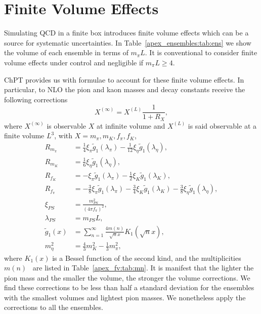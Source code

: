 
\chapter{Finite Volume Effects}
\label{apex_fv}

Simulating QCD in a finite box introduces finite volume effects which can be a source for systematic uncertainties. In Table~\ref{apex_ensembles:tab:ens} we show the volume of each ensemble in terms of $m_{\pi}L$. It is conventional to consider finite volume effects under control and negligible if $m_{\pi}L\geq4$.

ChPT provides us with formulae to account for these finite volume effects. In particular, to NLO the pion and kaon masses and decay constants receive the following corrections~\citep{Colangelo:2003hf,Colangelo:2005gd}
\begin{equation}
X^{(\infty)}=X^{(L)}\frac{1}{1+R_X},
\end{equation}
where $X^{(\infty)}$ is observable $X$ at infinite volume and $X^{(L)}$ is said observable at a finite volume $L^3$, with $X=m_{\pi},m_K,f_{\pi},f_K$,
\begin{align}
R_{m_{\pi}}&=\frac{1}{4}\xi_{\pi}\tilde{g}_1(\lambda_{\pi})-\frac{1}{12}\xi_{\eta}\tilde{g}_1(\lambda_{\eta}), \\
R_{m_K}&=\frac{1}{6}\xi_{\eta}\tilde{g}_1(\lambda_{\eta}), \\
R_{f_K}&=-\xi_{\pi}\tilde{g}_1(\lambda_{\pi})-\frac{1}{2}\xi_{K}\tilde{g}_1(\lambda_{K}), \\
R_{f_{\pi}}&=-\frac{3}{8}\xi_{\pi}\tilde{g}_1(\lambda_{\pi})-\frac{3}{4}\xi_{K}\tilde{g}_1(\lambda_{K})-\frac{3}{8}\xi_{\eta}\tilde{g}_1(\lambda_{\eta}), \\
\xi_{PS}&=\frac{m_{PS}^2}{(4\pi f_{\pi})^2}, \\
\lambda_{PS}&=m_{PS}L, \\
\tilde{g}_1(x)&=\sum_{n=1}^{\infty}\frac{4m(n)}{\sqrt{n}x}K_1(\sqrt{n}x), \\
m_{\eta}^2&=\frac{4}{3}m_K^2-\frac{1}{3}m_{\pi}^2,
\end{align}
where $K_1(x)$ is a Bessel function of the second kind, and the multiplicities $m(n)$~\citep{Colangelo:2003hf} are listed in Table~\ref{apex_fv:tab:mn}. It is manifest that the lighter the pion mass and the smaller the volume, the stronger the volume corrections. We find these corrections to be less than half a standard deviation for the ensembles with the smallest volumes and lightest pion masses. We nonetheless apply the corrections to all the ensembles.

